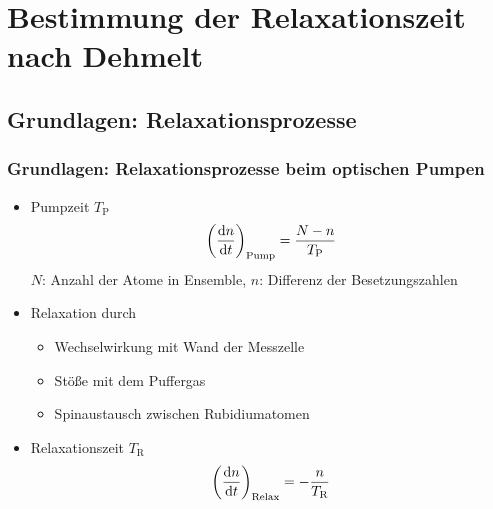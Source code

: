 
\section{Bestimmung der Relaxationszeit nach Dehmelt}
\subsection{Grundlagen: Relaxationsprozesse}

\begin{frame}
\frametitle{Grundlagen: Relaxationsprozesse beim optischen Pumpen}
\begin{itemize}[<+->]
    \item Pumpzeit $T_\text{P}$
    \begin{equation*}
        \left(\frac{\mathrm{d} n}{\mathrm{d} t}\right)_{\text{Pump}}=\frac{N-n}{T_\text{P}}
    \end{equation*}
    $N$: Anzahl der Atome in Ensemble, $n$: Differenz der Besetzungszahlen
    \item Relaxation durch
    \begin{itemize}[<+->]
        \item Wechselwirkung mit Wand der Messzelle
        \item Stöße mit dem Puffergas
        \item Spinaustausch zwischen Rubidiumatomen
    \end{itemize}
    \item Relaxationszeit $T_\text{R}$
    \begin{equation*}
        \left(\frac{\mathrm{d} n}{\mathrm{d} t}\right)_{\text{Relax}}=-\frac{n}{T_\text{R}}
    \end{equation*}
\end{itemize}
\end{frame}


